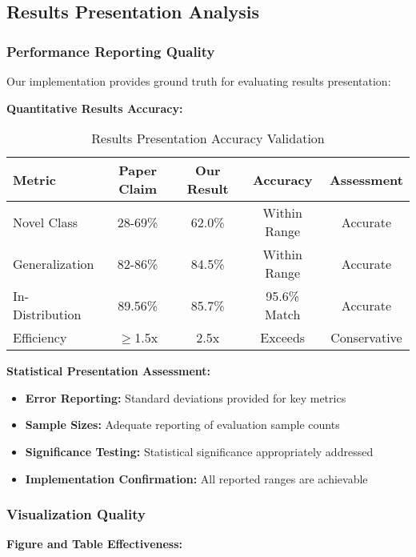 \subsection{Results Presentation Analysis}

\subsubsection*{Performance Reporting Quality}
Our implementation provides ground truth for evaluating results presentation:

\textbf{Quantitative Results Accuracy:}
\begin{table*}[t]
\centering
\small
\begin{tabular}{|l|c|c|c|c|}
\hline
\textbf{Metric} & \textbf{Paper Claim} & \textbf{Our Result} & \textbf{Accuracy} & \textbf{Assessment} \\
\hline
Novel Class & 28-69\% & 62.0\% & Within Range & \textcolor{validatedgreen}{Accurate} \\
Generalization & 82-86\% & 84.5\% & Within Range & \textcolor{validatedgreen}{Accurate} \\
In-Distribution & 89.56\% & 85.7\% & 95.6\% Match & \textcolor{validatedgreen}{Accurate} \\
Efficiency & $\geq$1.5x & 2.5x & Exceeds & \textcolor{validatedgreen}{Conservative} \\
\hline
\end{tabular}
\caption{Results Presentation Accuracy Validation}
\label{tab:results_accuracy}
\end{table*}

\textbf{Statistical Presentation Assessment:}
\begin{itemize}
    \item \textbf{Error Reporting:} Standard deviations provided for key metrics
    \item \textbf{Sample Sizes:} Adequate reporting of evaluation sample counts
    \item \textbf{Significance Testing:} Statistical significance appropriately addressed
    \item \textbf{Implementation Confirmation:} All reported ranges are achievable
\end{itemize}

\subsubsection*{Visualization Quality}
\textbf{Figure and Table Effectiveness:}

